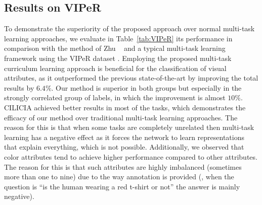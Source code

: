 \documentclass[10pt,twocolumn,letterpaper]{article}
\begin{document}
	\subsection{Results on VIPeR}
	To demonstrate the superiority of the proposed approach over normal multi-task learning approaches, we evaluate in Table~\ref{tab:VIPeR} its performance in comparison with the method of Zhu \etal~\cite{zhu2015multi} and a typical multi-task learning framework using the VIPeR dataset \cite{gray2007evaluating}. Employing the proposed multi-task curriculum learning approach is beneficial for the classification of visual attributes, as it outperformed the previous state-of-the-art by improving the total results by \(6.4\%\). Our method is superior in both groups but especially in the strongly correlated group of labels, in which the improvement is almost \(10\%\). CILICIA achieved better results in most of the tasks, which demonstrates the efficacy of our method over traditional multi-task learning approaches. The reason for this is that when some tasks are completely unrelated then multi-task learning has a negative effect as it forces the network to learn representations that explain everything, which is not possible. Additionally, we observed that color attributes tend to achieve higher performance compared to other attributes. The reason for this is that such attributes are highly imbalanced (sometimes more than one to nine) due to the way annotation is provided (\eg, when the question is ``is the human wearing a red t-shirt or not'' the answer is mainly negative).
	
	
	
\end{document}
